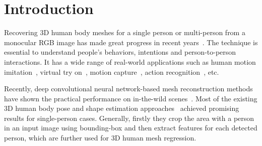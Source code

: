 \documentclass[runningheads]{llncs}
\begin{document}
\section{Introduction}

Recovering 3D human body meshes for a single person or multi-person from a monocular RGB image has made great progress in recent years~\cite{bogo2016keep,choi2021beyond,choi20213Dcrowdnet,guler2019holopose,jiang2020coherent,kanazawa2018end,kanazawa2019learning,kocabas2020vibe,kocabas2021pare,kocabas2021spec,kolotouros2019learning,lin2021end,lin2021mesh,sun2021monocular,tran2022meshletemp,xu2019denserac,zhang2021body,zhang2021pymaf}. The technique is essential to understand people's behaviors, intentions and person-to-person interactions. It has a wide range of real-world applications such as human motion imitation~\cite{liu2019liquid}, virtual try on~\cite{mir2020learning}, motion capture~\cite{mehta2020xnect}, action recognition~\cite{cha2022learning,saqlain20223dmesh,varol2021synthetic}, etc.

Recently, deep convolutional neural network-based mesh reconstruction methods~\cite{cha2021towards,choi2021beyond,choi20213Dcrowdnet,guler2019holopose,jiang2020coherent,kanazawa2018end,kanazawa2019learning,kocabas2020vibe,kocabas2021pare,kocabas2021spec,kolotouros2019learning,lin2021end,lin2021mesh,sun2021monocular,tran2022meshletemp,xu2019denserac,zhang2021body,zhang2021pymaf} have shown the practical performance on in-the-wild scenes~\cite{ionescu2013human3,joo2015panoptic,von2018recovering,mehta2017monocular}. Most of the existing 3D human body pose and shape estimation approaches~\cite{cha2021towards,choi2021beyond,guler2019holopose,kanazawa2018end,kanazawa2019learning,kocabas2020vibe,kocabas2021pare,kocabas2021spec,kolotouros2019learning,lin2021end,lin2021mesh,xu2019denserac} achieved promising results for single-person cases. Generally, firstly they crop the area with a person in an input image using bounding-box and then extract features for each detected person, which are further used for 3D human mesh regression.
\end{document}
